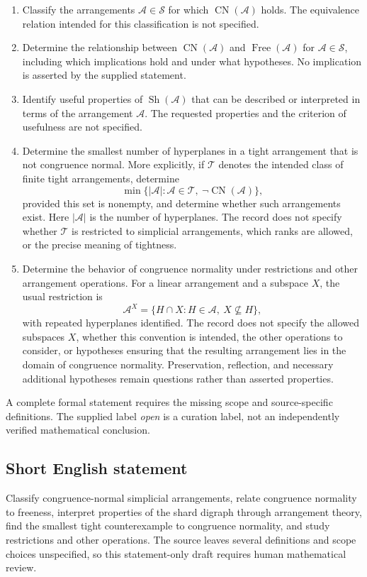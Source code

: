 \documentclass[11pt]{article}
\begin{document}
\begin{enumerate}
\item Classify the arrangements \(\mathcal A\in\mathscr S\) for which \(\operatorname{CN}(\mathcal A)\) holds. The equivalence relation intended for this classification is not specified.
\item Determine the relationship between \(\operatorname{CN}(\mathcal A)\) and \(\operatorname{Free}(\mathcal A)\) for \(\mathcal A\in\mathscr S\), including which implications hold and under what hypotheses. No implication is asserted by the supplied statement.
\item Identify useful properties of \(\operatorname{Sh}(\mathcal A)\) that can be described or interpreted in terms of the arrangement \(\mathcal A\). The requested properties and the criterion of usefulness are not specified.
\item Determine the smallest number of hyperplanes in a tight arrangement that is not congruence normal. More explicitly, if \(\mathscr T\) denotes the intended class of finite tight arrangements, determine
\[
\min\bigl\{\lvert\mathcal A\rvert:\mathcal A\in\mathscr T,\ \neg\operatorname{CN}(\mathcal A)\bigr\},
\]
provided this set is nonempty, and determine whether such arrangements exist. Here \(\lvert\mathcal A\rvert\) is the number of hyperplanes. The record does not specify whether \(\mathscr T\) is restricted to simplicial arrangements, which ranks are allowed, or the precise meaning of tightness.
\item Determine the behavior of congruence normality under restrictions and other arrangement operations. For a linear arrangement and a subspace \(X\), the usual restriction is
\[
\mathcal A^{X}=\{H\cap X:H\in\mathcal A,\ X\not\subseteq H\},
\]
with repeated hyperplanes identified. The record does not specify the allowed subspaces \(X\), whether this convention is intended, the other operations to consider, or hypotheses ensuring that the resulting arrangement lies in the domain of congruence normality. Preservation, reflection, and necessary additional hypotheses remain questions rather than asserted properties.
\end{enumerate}

A complete formal statement requires the missing scope and source-specific definitions. The supplied label \emph{open} is a curation label, not an independently verified mathematical conclusion.
\subsection{Short English statement}
Classify congruence-normal simplicial arrangements, relate congruence normality to freeness, interpret properties of the shard digraph through arrangement theory, find the smallest tight counterexample to congruence normality, and study restrictions and other operations. The source leaves several definitions and scope choices unspecified, so this statement-only draft requires human mathematical review.
\end{document}
